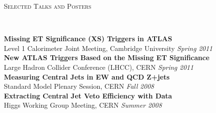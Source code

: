 \documentclass[9pt]{article}
\newenvironment{changemargin}[2]{%
  \begin{list}{}{%
    \setlength{\topsep}{0pt}%
    \setlength{\leftmargin}{#1}%
    \setlength{\rightmargin}{#2}%
    \setlength{\listparindent}{\parindent}%
    \setlength{\itemindent}{\parindent}%
    \setlength{\parsep}{\parskip}%
  }%
  \item[]}{\end{list}
}
\newcommand{\lineover}{
	\begin{changemargin}{-0.05in}{-0.05in}
		\vspace*{-8pt}
		\hrulefill \\
		\vspace*{-2pt}
	\end{changemargin}
}
\newcommand{\header}[1]{
	\begin{changemargin}{-0.5in}{-0.5in}
		\scshape{#1}\\
  	\lineover
	\end{changemargin}
}
\newenvironment{body} {
	\vspace*{-16pt}
	\begin{changemargin}{-0.25in}{-0.5in}
  }	
	{\end{changemargin}
}
\begin{document}
\smallskip

\header{Selected Talks and Posters}
\begin{body}
	\vspace{14pt}
        \textbf{Missing ET Significance (XS) Triggers in ATLAS} \\
        Level 1 Calorimeter Joint Meeting, Cambridge University \hfill \emph{Spring 2011} \\
        \medskip
        \textbf{New ATLAS Triggers Based on the Missing ET Significance} \\
        Large Hadron Collider Conference (LHCC), CERN \hfill \emph{Spring 2011} \\
        \medskip
        \textbf{Measuring Central Jets in EW and QCD Z+jets} \\
        Standard Model Plenary Session, CERN \hfill  \emph{Fall 2008} \\
        \medskip
        \textbf{Extracting Central Jet Veto Efficiency with Data} \\
        Higgs Working Group Meeting, CERN \hfill \emph{Summer 2008} \\

\end{body}
\end{document}
